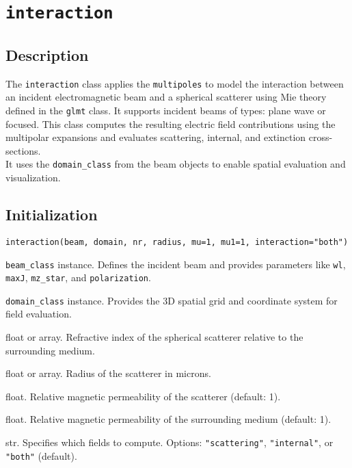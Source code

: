 \section{\texttt{interaction}}

\subsection{Description}
The \texttt{interaction} class applies the \texttt{multipoles} to model the interaction between an incident electromagnetic beam and a spherical scatterer using Mie theory defined in the \texttt{glmt} class. It supports incident beams of types: plane wave or focused. This class computes the resulting electric field contributions using the multipolar expansions and evaluates scattering, internal, and extinction cross-sections.\\ It uses the \texttt{domain\_class} from the beam objects to enable spatial evaluation and visualization.

\subsection{Initialization}
\begin{verbatim}
interaction(beam, domain, nr, radius, mu=1, mu1=1, interaction="both")
\end{verbatim}

\begin{description}[leftmargin=3cm]
  \item[\texttt{beam:}] \texttt{beam\_class} instance. Defines the incident beam and provides parameters like \texttt{wl}, \texttt{maxJ}, \texttt{mz\_star}, and \texttt{polarization}.
  \item[\texttt{domain:}] \texttt{domain\_class} instance. Provides the 3D spatial grid and coordinate system for field evaluation.
  \item[\texttt{nr:}] float or array. Refractive index of the spherical scatterer relative to the surrounding medium.
  \item[\texttt{radius:}] float or array. Radius of the scatterer in microns.
  \item[\texttt{mu:}] float. Relative magnetic permeability of the scatterer (default: 1).
  \item[\texttt{mu1:}] float. Relative magnetic permeability of the surrounding medium (default: 1).
  \item[\texttt{interaction:}] str. Specifies which fields to compute. Options: \texttt{"scattering"}, \texttt{"internal"}, or \texttt{"both"} (default).
\end{description}

